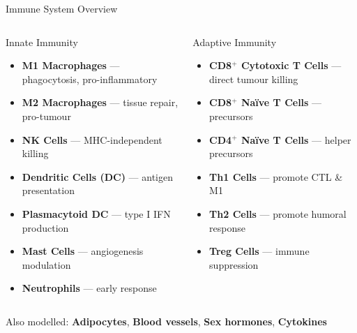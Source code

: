 \documentclass[aspectratio=169,10pt]{beamer}
\begin{document}
\begin{frame}{Immune System Overview}
  \begin{columns}[T]
    \begin{block}{Innate Immunity}
      \begin{itemize}
        \item \textbf{M1 Macrophages} --- phagocytosis, pro-inflammatory
        \item \textbf{M2 Macrophages} --- tissue repair, pro-tumour
        \item \textbf{NK Cells} --- MHC-independent killing
        \item \textbf{Dendritic Cells (DC)} --- antigen presentation
        \item \textbf{Plasmacytoid DC} --- type I IFN production
        \item \textbf{Mast Cells} --- angiogenesis modulation
        \item \textbf{Neutrophils} --- early response
      \end{itemize}
    \end{block}

    \begin{block}{Adaptive Immunity}
      \begin{itemize}
        \item \textbf{CD8$^+$ Cytotoxic T Cells} --- direct tumour killing
        \item \textbf{CD8$^+$ Na\"ive T Cells} --- precursors
        \item \textbf{CD4$^+$ Na\"ive T Cells} --- helper precursors
        \item \textbf{Th1 Cells} --- promote CTL \& M1
        \item \textbf{Th2 Cells} --- promote humoral response
        \item \textbf{Treg Cells} --- immune suppression
      \end{itemize}
    \end{block}
  \end{columns}
  \vspace{0.3em}
  \centering\small Also modelled: \textbf{Adipocytes}, \textbf{Blood vessels}, \textbf{Sex hormones}, \textbf{Cytokines}
\end{frame}
\end{document}
